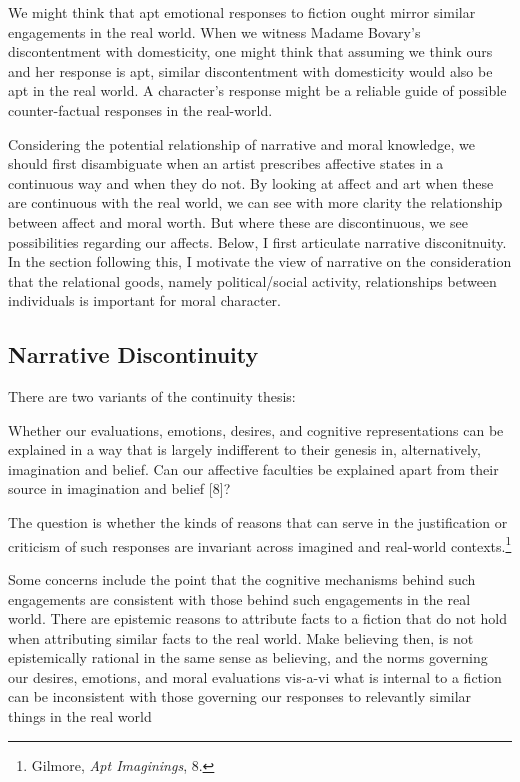 \documentclass[phdthesis,12pt,final]{wuthesis}
\theoremstyle{definition}
\theoremstyle{definition}
\theoremstyle{definition}
\theoremstyle{definition}
\theoremstyle{remark}
\begin{document}
We might think that apt emotional responses to fiction ought mirror similar engagements in the real world. When we witness Madame Bovary's discontentment with domesticity, one might think that assuming we think ours and her response is apt, similar discontentment with domesticity would also be apt in the real world. A character's response might be a reliable guide of possible counter-factual responses in the real-world.

Considering the potential relationship of narrative and moral knowledge, we should first disambiguate when an artist prescribes affective states in a continuous way and when they do not. By looking at affect and art when these are continuous with the real world, we can see with more clarity the relationship between affect and moral worth. But where these are discontinuous, we see possibilities regarding our affects. Below, I first articulate narrative disconitnuity. In the section following this, I motivate the view of narrative on the consideration that the relational goods, namely political/social activity, relationships between individuals is important for moral character.

\subsection*{Narrative Discontinuity}\label{narrative-discontinuity}

There are two variants of the continuity thesis:

Whether our evaluations, emotions, desires, and cognitive representations can be explained in a way that is largely indifferent to their genesis in, alternatively, imagination and belief. Can our affective faculties be explained apart from their source in imagination and belief {[}8{]}?

The question is whether the kinds of reasons that can serve in the justification or criticism of such responses are invariant across imagined and real-world contexts.\footnote{Gilmore, \emph{Apt {Imaginings}}, 8.}

Some concerns include the point that the cognitive mechanisms behind such engagements are consistent with those behind such engagements in the real world. There are epistemic reasons to attribute facts to a fiction that do not hold when attributing similar facts to the real world. Make believing then, is not epistemically rational in the same sense as believing, and the norms governing our desires, emotions, and moral evaluations vis-a-vi what is internal to a fiction can be inconsistent with those governing our responses to relevantly similar things in the real world
\end{document}
